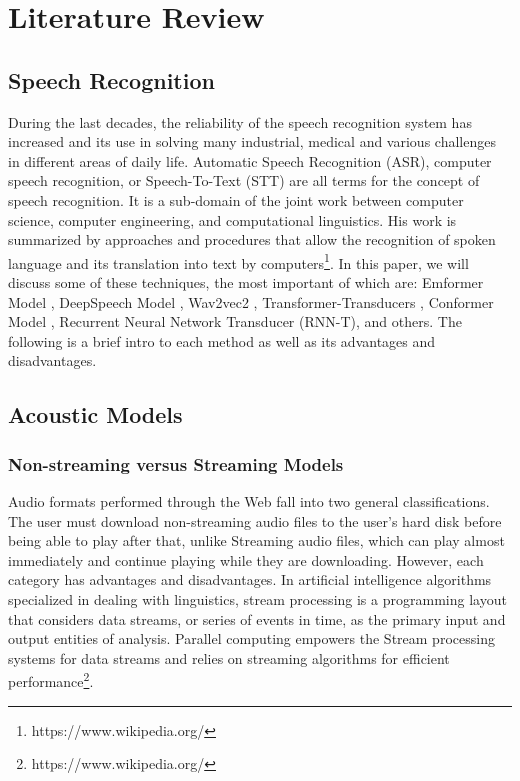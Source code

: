 \chapter{Literature Review}
\label{cha:relatedwork}




\section{Speech Recognition}


During the last decades, the reliability of the speech recognition system has increased and its use in solving many industrial, medical and various challenges in different areas of daily life\cite{benesty2008automatic}.
Automatic Speech Recognition (ASR), computer speech recognition, or Speech-To-Text (STT) are all terms for the concept of speech recognition. It is a sub-domain of the joint work between computer science, computer engineering, and computational linguistics. His work is summarized by approaches and procedures that allow the recognition of spoken language and its translation into text by computers\footnote{https://www.wikipedia.org/}.
In this paper, we will discuss some of these techniques, the most important of which are: Emformer Model \cite{shi2021emformer,dai2019transformer}, DeepSpeech Model \cite{markert21_spsc}, Wav2vec2 \cite{karthick2022speaker}, Transformer-Transducers \cite{yeh2019transformer}, Conformer Model \cite{gulati2020conformer}, Recurrent Neural Network Transducer (RNN-T)\cite{zhang2020transformer}, and others. The following is a brief intro to each method as well as its advantages and disadvantages.

\section{Acoustic Models}
\subsection{Non-streaming versus Streaming Models}

Audio formats performed through the Web fall into two general classifications. The user must download non-streaming audio files to the user's hard disk before being able to play after that, unlike Streaming audio files, which can play almost immediately and continue playing while they are downloading. However, each category has advantages and disadvantages. In artificial intelligence algorithms specialized in dealing with linguistics, stream processing is a programming layout that considers data streams, or series of events in time, as the primary input and output entities of analysis. Parallel computing empowers the Stream processing systems for data streams and relies on streaming algorithms for efficient performance\footnote{https://www.wikipedia.org/}.

